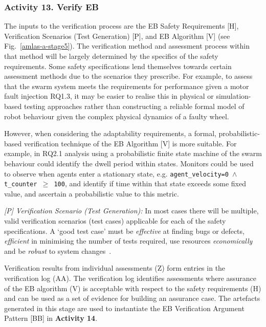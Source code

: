 \documentclass[runningheads]{llncs}
\begin{document}
\subsubsection*{Activity 13. Verify EB}
The inputs to the verification process are the EB Safety Requirements [H], Verification Scenarios (Test Generation) [P], and EB Algorithm [V] (see Fig.~\ref{amlas-a-stage5}). 
%
The verification method and assessment process within that method will be largely determined by the specifics of the safety requirements. Some safety specifications lend themselves towards certain assessment methods due to the scenarios they prescribe.
%
For example, to assess that the swarm system meets the requirements for performance given a motor fault injection RQ1.3, it may be easier to realise this in physical or simulation-based testing approaches rather than constructing a reliable formal model of robot behaviour given the complex physical dynamics of a faulty wheel.

%
However, when considering the adaptability requirements, a formal, probabilistic-based verification technique of the EB Algorithm [V] is more suitable. For example, in RQ2.1 analysis using a probabilistic finite state machine of the swarm behaviour could identify the dwell period within states. Monitors could be used to observe when agents enter a stationary state, e.g. \texttt{agent\_velocity=0 $\land $  t\_counter  $\ge$ 100}, and identify if time within that state exceeds some fixed value, and ascertain a probabilistic value to this metric.

\emph{[P] Verification Scenario (Test Generation):} In most cases there will be multiple, valid verification scenarios (test cases) applicable for each of the safety specifications. A `good test case' must be \emph{effective} at finding bugs or defects, \emph{efficient} in minimising the number of tests required, use resources \emph{economically} and be \emph{robust} to system changes~\cite{Fewster1999}. 

Verification results from individual assessments (Z) form entries in the verification log (AA). The verification log identifies assessments where assurance of the EB algorithm (V) is acceptable with respect to the safety requirements (H) and can be used as a set of evidence for building an assurance case.%
The artefacts generated in this stage are used to instantiate the EB Verification Argument Pattern [BB] in \textbf{Activity 14}.

\vspace{-2ex}
\end{document}
